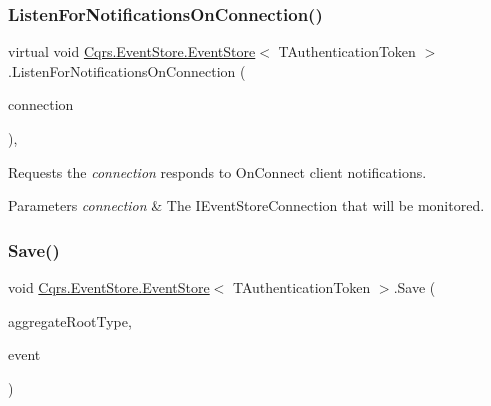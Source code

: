 \mbox{\label{classCqrs_1_1EventStore_1_1EventStore_add7396a800fe8f64c61406311e8fee1d_add7396a800fe8f64c61406311e8fee1d}} 
\subsubsection{\texorpdfstring{Listen\+For\+Notifications\+On\+Connection()}{ListenForNotificationsOnConnection()}}
{\footnotesize\ttfamily virtual void \hyperlink{classCqrs_1_1EventStore_1_1EventStore}{Cqrs.\+Event\+Store.\+Event\+Store}$<$ T\+Authentication\+Token $>$.Listen\+For\+Notifications\+On\+Connection (\begin{DoxyParamCaption}\item[{I\+Event\+Store\+Connection}]{connection }\end{DoxyParamCaption})\hspace{0.3cm}{\ttfamily [protected]}, {\ttfamily [virtual]}}



Requests the {\itshape connection}  responds to On\+Connect client notifications. 


\begin{DoxyParams}{Parameters}
{\em connection} & The I\+Event\+Store\+Connection that will be monitored.\\
\hline
\end{DoxyParams}
\mbox{\label{classCqrs_1_1EventStore_1_1EventStore_adce33037e2a3eb81cfccded42ba2ed35_adce33037e2a3eb81cfccded42ba2ed35}} 
\subsubsection{\texorpdfstring{Save()}{Save()}}
{\footnotesize\ttfamily void \hyperlink{classCqrs_1_1EventStore_1_1EventStore}{Cqrs.\+Event\+Store.\+Event\+Store}$<$ T\+Authentication\+Token $>$.Save (\begin{DoxyParamCaption}\item[{Type}]{aggregate\+Root\+Type,  }\item[{\hyperlink{interfaceCqrs_1_1Events_1_1IEvent}{I\+Event}$<$ T\+Authentication\+Token $>$ @}]{event }\end{DoxyParamCaption})}




